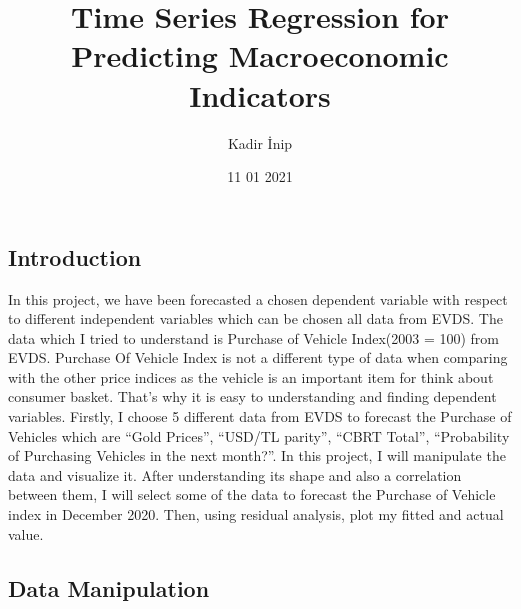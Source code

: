 \documentclass[
]{article}
\title{Time Series Regression for Predicting Macroeconomic Indicators}
\author{Kadir İnip}
\date{11 01 2021}
\newenvironment{Shaded}{\begin{snugshade}}{\end{snugshade}}
\newcommand{\FunctionTok}[1]{\textcolor[rgb]{0.00,0.00,0.00}{#1}}
\newcommand{\NormalTok}[1]{#1}
\newcommand{\OtherTok}[1]{\textcolor[rgb]{0.56,0.35,0.01}{#1}}
\newcommand{\SpecialCharTok}[1]{\textcolor[rgb]{0.00,0.00,0.00}{#1}}
\newcommand{\StringTok}[1]{\textcolor[rgb]{0.31,0.60,0.02}{#1}}
\begin{document}
\maketitle

\hypertarget{introduction}{%
\subsection{Introduction}\label{introduction}}

In this project, we have been forecasted a chosen dependent variable
with respect to different independent variables which can be chosen all
data from EVDS. The data which I tried to understand is Purchase of
Vehicle Index(2003 = 100) from EVDS. Purchase Of Vehicle Index is not a
different type of data when comparing with the other price indices as
the vehicle is an important item for think about consumer basket. That's
why it is easy to understanding and finding dependent variables.
Firstly, I choose 5 different data from EVDS to forecast the Purchase of
Vehicles which are ``Gold Prices'', ``USD/TL parity'', ``CBRT Total'',
``Probability of Purchasing Vehicles in the next month?''. In this
project, I will manipulate the data and visualize it. After
understanding its shape and also a correlation between them, I will
select some of the data to forecast the Purchase of Vehicle index in
December 2020. Then, using residual analysis, plot my fitted and actual
value.

\hypertarget{data-manipulation}{%
\subsection{Data Manipulation}\label{data-manipulation}}

\begin{Shaded}
\end{Shaded}
\end{document}
